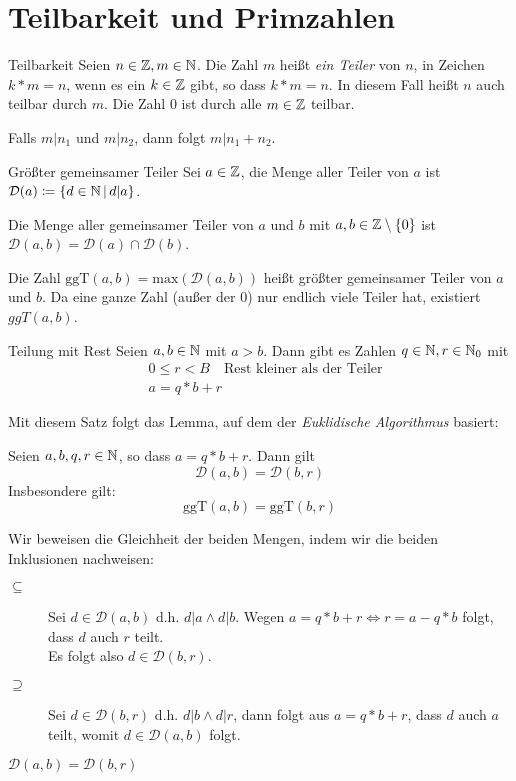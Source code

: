\section{Teilbarkeit und Primzahlen}
\begin{definition}{Teilbarkeit}
	Seien $n\in\mathbb{Z}, m\in\mathbb{N}$. Die Zahl $m$ heißt \emph{ein Teiler} von $n$, in Zeichen $k* m=n$, wenn es ein $k\in\mathbb{Z}$ gibt, so dass $k* m = n$. In diesem Fall heißt $n$ auch teilbar durch $m$.
	Die Zahl $0$ ist durch alle $m\in\mathbb{Z}$ teilbar.
\end{definition}
Falls $m|n_1$ und $m|n_2$, dann folgt $m|n_1+n_2$.

\begin{definition}{Größter gemeinsamer Teiler}
	Sei $a\in\mathbb{Z}$, die Menge aller Teiler von $a$ ist $\mathcal{D}(a)\coloneqq\left\{ d\in\mathbb{N} \,\middle|\, d|a \right\}$.

	Die Menge aller gemeinsamer Teiler von $a$ und $b$ mit $a,b\in\mathbb{Z}\setminus\{ 0\}$ ist $\mathcal{D}(a,b) = \mathcal{D}(a) \cap \mathcal{D}(b)$.

	Die Zahl $\mathrm{ggT}(a,b) = \mathrm{max}(\mathcal{D}(a,b))$ heißt größter gemeinsamer Teiler von $a$ und $b$. Da eine ganze Zahl (außer der $0$) nur endlich viele Teiler hat, existiert $ggT(a,b)$.
\end{definition}


\begin{satz}{Teilung mit Rest}
  Seien $a,b\in\mathbb{N}$ mit $a>b$. Dann gibt es Zahlen $q\in\mathbb{N}, r\in\mathbb{N}_0$ mit
  \begin{align*}
    &0\leq r<B \quad\text{Rest kleiner als der Teiler}\\
    &a=q*b+r
  \end{align*}
\end{satz}
Mit diesem Satz folgt das Lemma, auf dem der \emph{Euklidische Algorithmus} basiert:
\begin{lemma}{}
  Seien $a,b,q,r\in\mathbb{N}$, so dass $a=q*b+r$. Dann gilt
  \begin{equation*}
    \mathcal{D}(a,b)=\mathcal{D}(b,r)
  \end{equation*}
  Insbesondere gilt:
  \begin{equation*}
    \mathrm{ggT}(a,b)=\mathrm{ggT}(b,r)
  \end{equation*}
\end{lemma}
\beweis
Wir beweisen die Gleichheit der beiden Mengen, indem wir die beiden Inklusionen nachweisen:

\begin{description}
  \item[\glqq$\subseteq$\grqq]
  Sei $d\in\mathcal{D}(a,b)$ d.h. $d|a \wedge d|b$. Wegen $a=q*b+r \Leftrightarrow r=a-q*b$ folgt, dass $d$ auch $r$ teilt.\\
  Es folgt also $d\in \mathcal{D}(b,r)$.
  \item[\glqq$\supseteq$\grqq]
  Sei $d\in\mathcal{D}(b,r)$ d.h. $d|b\wedge d|r$, dann folgt aus $a=q*b+r$, dass $d$ auch $a$ teilt, womit $d\in \mathcal{D}(a,b)$ folgt.
\end{description}
$\mathcal{D}(a,b)=\mathcal{D}(b,r)$

